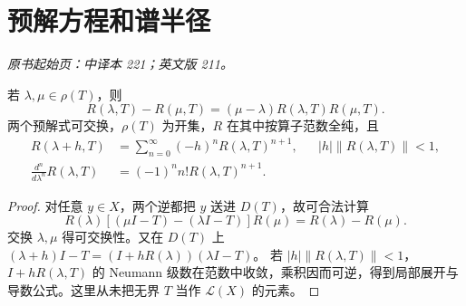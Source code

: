 \section{预解方程和谱半径}\label{sec:yosida-08-02}
\noindent\textit{原书起始页：中译本 221；英文版 211。}

\begin{theorem}[预解恒等式与局部展开]\label{thm:y8-resolvent-identity}
若 $\lambda,\mu\in\rho(T)$，则
\begin{equation}\label{eq:y8-resolvent-identity}
 R(\lambda,T)-R(\mu,T)=(\mu-\lambda)R(\lambda,T)R(\mu,T).
\end{equation}
两个预解式可交换，$\rho(T)$ 为开集，$R$ 在其中按算子范数全纯，且
\begin{align}
 R(\lambda+h,T)&=\sum_{n=0}^\infty(-h)^nR(\lambda,T)^{n+1},
 &&|h|\|R(\lambda,T)\|<1,\label{eq:y8-local-series}\\
 \frac{d^n}{d\lambda^n}R(\lambda,T)&=(-1)^n n!R(\lambda,T)^{n+1}.\label{eq:y8-resolvent-derivative}
\end{align}
\end{theorem}
\begin{proof}
对任意 $y\in X$，两个逆都把 $y$ 送进 $D(T)$，故可合法计算
\[
 R(\lambda)[(\mu I-T)-(\lambda I-T)]R(\mu)
 =R(\lambda)-R(\mu).
\]
交换 $\lambda,\mu$ 得可交换性。又在 $D(T)$ 上
$(\lambda+h)I-T=(I+hR(\lambda))(\lambda I-T)$。
若 $|h|\|R(\lambda,T)\|<1$，$I+hR(\lambda,T)$ 的 Neumann 级数在范数中收敛，乘积因而可逆，得到局部展开与导数公式。这里从未把无界 $T$ 当作 $\mathcal L(X)$ 的元素。
\end{proof}

